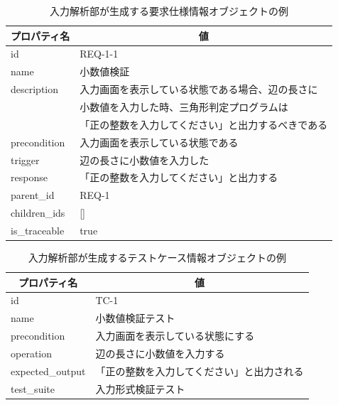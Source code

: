 \begin{table}[tp]
    \caption{入力解析部が生成する要求仕様情報オブジェクトの例}\label{tb:reqspec_obj_example}
    \centering
    \begin{tabular}{l|l}
        \multicolumn{1}{c|}{プロパティ名} & \multicolumn{1}{c}{値} \\
        \hline
        \hline
        id & REQ-1-1 \\
        \hline
        name & 小数値検証 \\
        \hline
        description & 入力画面を表示している状態である場合、辺の長さに \\
                    & 小数値を入力した時、三角形判定プログラムは \\
                    & 「正の整数を入力してください」と出力するべきである \\
        \hline
        precondition & 入力画面を表示している状態である \\
        \hline
        trigger & 辺の長さに小数値を入力した \\
        \hline
        response & 「正の整数を入力してください」と出力する \\
        \hline
        parent\_id & REQ-1 \\
        \hline
        children\_ids & [] \\
        \hline
        is\_traceable & true \\
        \hline
    \end{tabular}
\end{table}

\begin{table}[tp]
    \caption{入力解析部が生成するテストケース情報オブジェクトの例}\label{tb:testcase_obj_example}
    \centering
    \begin{tabular}{l|l}
        \multicolumn{1}{c|}{プロパティ名} & \multicolumn{1}{c}{値} \\
        \hline
        \hline
        id & TC-1 \\
        \hline
        name & 小数値検証テスト \\
        \hline
        precondition & 入力画面を表示している状態にする \\
        \hline
        operation & 辺の長さに小数値を入力する \\
        \hline
        expected\_output & 「正の整数を入力してください」と出力される \\
        \hline
        test\_suite & 入力形式検証テスト \\
        \hline
    \end{tabular}
\end{table}

